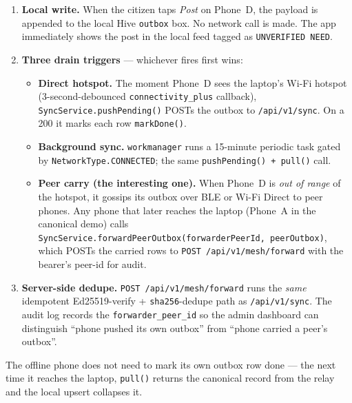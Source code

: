 \documentclass[11pt,a4paper]{article}
\begin{document}
\begin{enumerate}[leftmargin=*,label=\textbf{\arabic*.}]
  \item \textbf{Local write.} When the citizen taps \emph{Post} on
        Phone~D, the payload is appended to the local Hive
        \texttt{outbox} box. No network call is made. The app
        immediately shows the post in the local feed tagged as
        \texttt{UNVERIFIED~NEED}.
  \item \textbf{Three drain triggers} --- whichever fires first wins:
        \begin{itemize}
          \item \textbf{Direct hotspot.} The moment Phone~D sees the
                laptop's Wi-Fi hotspot (3-second-debounced
                \texttt{connectivity\_plus} callback),
                \texttt{SyncService.pushPending()} POSTs the outbox
                to \texttt{/api/v1/sync}. On a 200 it marks each row
                \texttt{markDone()}.
          \item \textbf{Background sync.} \texttt{workmanager} runs a
                15-minute periodic task gated by
                \texttt{NetworkType.CONNECTED}; the same
                \texttt{pushPending() + pull()} call.
          \item \textbf{Peer carry (the interesting one).} When
                Phone~D is \emph{out of range} of the hotspot, it
                gossips its outbox over BLE or Wi-Fi Direct to peer
                phones. Any phone that later reaches the laptop
                (Phone~A in the canonical demo) calls
                \texttt{SyncService.forwardPeerOutbox(forwarderPeerId,
                peerOutbox)}, which POSTs the carried rows to
                \texttt{POST /api/v1/mesh/forward} with the bearer's
                peer-id for audit.
        \end{itemize}
  \item \textbf{Server-side dedupe.}
        \texttt{POST /api/v1/mesh/forward} runs the \emph{same}
        idempotent Ed25519-verify + \texttt{sha256}-dedupe path as
        \texttt{/api/v1/sync}. The audit log records the
        \texttt{forwarder\_peer\_id} so the admin dashboard can
        distinguish ``phone pushed its own outbox'' from ``phone
        carried a peer's outbox''.
\end{enumerate}

The offline phone does not need to mark its own outbox row done ---
the next time it reaches the laptop, \texttt{pull()} returns the
canonical record from the relay and the local upsert collapses it.
\end{document}

